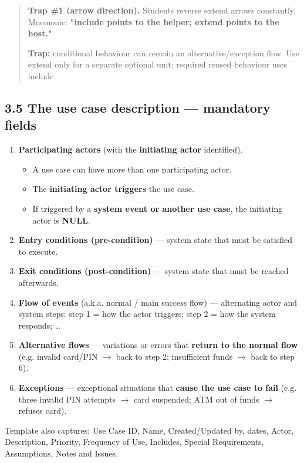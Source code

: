 \begin{studycolumns}
\vspace{0pt}


\begin{quote}\small\color{navy}
\textbf{Trap \#1 (arrow direction).} Students reverse \guillemotleft{}extend\guillemotright{} arrows constantly. Mnemonic: \textbf{"include points to the helper; extend points to the host."}

\textbf{Trap:} conditional behaviour can remain an alternative/exception flow. Use extend only for a separate optional unit; required reused behaviour uses include.


\end{quote}
\subsection*{3.5 The use case description --- mandatory fields}
\begin{enumerate}
\item \textbf{Participating actors} (with the \textbf{initiating actor} identified).
\begin{itemize}
\item A use case can have more than one participating actor.
\item The \textbf{initiating actor triggers} the use case.
\item If triggered by a \textbf{system event or another use case}, the initiating actor is \textbf{NULL}.
\end{itemize}
\item \textbf{Entry conditions (pre-condition)} --- system state that must be satisfied to execute.
\item \textbf{Exit conditions (post-condition)} --- system state that must be reached afterwards.
\item \textbf{Flow of events} (a.k.a. normal /\allowbreak{} main success flow) --- alternating actor and system steps: step 1 = how the actor triggers; step 2 = how the system responds; \ldots{}
\item \textbf{Alternative flows} --- variations or errors that \textbf{return to the normal flow} (e.g. invalid card/\allowbreak{}PIN \ensuremath{\rightarrow} back to step 2; insufficient funds \ensuremath{\rightarrow} back to step 6).
\item \textbf{Exceptions} --- exceptional situations that \textbf{cause the use case to fail} (e.g. three invalid PIN attempts \ensuremath{\rightarrow} card suspended; ATM out of funds \ensuremath{\rightarrow} refuses card).
\end{enumerate}
Template also captures: Use Case ID, Name, Created/\allowbreak{}Updated by, dates, Actor, Description, Priority, Frequency of Use, Includes, Special Requirements, Assumptions, Notes and Issues.


\end{studycolumns}
